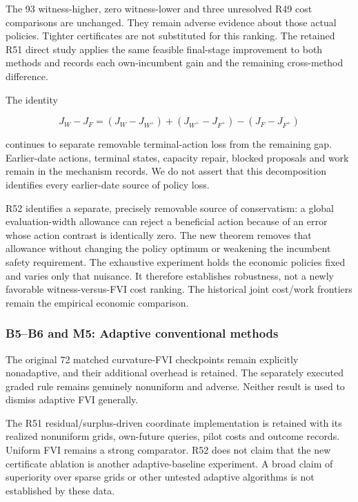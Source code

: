 The 93 witness-higher, zero witness-lower and three unresolved R49 cost
comparisons are unchanged. They remain adverse evidence about those
actual policies. Tighter certificates are not substituted for this
ranking. The retained R51 direct study applies the same feasible
final-stage improvement to both methods and records each own-incumbent
gain and the remaining cross-method difference.

The identity

\[
J_W-J_F=(J_W-J_{W^+})+(J_{W^+}-J_{F^+})-(J_F-J_{F^+})
\]

continues to separate removable terminal-action loss from the remaining
gap. Earlier-date actions, terminal states, capacity repair, blocked
proposals and work remain in the mechanism records. We do not assert
that this decomposition identifies every earlier-date source of policy
loss.

R52 identifies a separate, precisely removable source of conservatism: a
global evaluation-width allowance can reject a beneficial action because
of an error whose action contrast is identically zero. The new theorem
removes that allowance without changing the policy optimum or weakening
the incumbent safety requirement. The exhaustive experiment holds the
economic policies fixed and varies only that nuisance. It therefore
establishes robustness, not a newly favorable witness-versus-FVI cost
ranking. The historical joint cost/work frontiers remain the empirical
economic comparison.

\hypertarget{b5b6-and-m5-adaptive-conventional-methods}{%
\subsubsection{B5--B6 and M5: Adaptive conventional
methods}\label{b5b6-and-m5-adaptive-conventional-methods}}

The original 72 matched curvature-FVI checkpoints remain explicitly
nonadaptive, and their additional overhead is retained. The separately
executed graded rule remains genuinely nonuniform and adverse. Neither
result is used to dismiss adaptive FVI generally.

The R51 residual/surplus-driven coordinate implementation is retained
with its realized nonuniform grids, own-future queries, pilot costs and
outcome records. Uniform FVI remains a strong comparator. R52 does not
claim that the new certificate ablation is another adaptive-baseline
experiment. A broad claim of superiority over sparse grids or other
untested adaptive algorithms is not established by these data.

